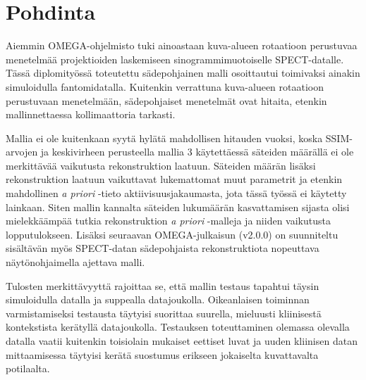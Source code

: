 \section{Pohdinta}
Aiemmin OMEGA-ohjelmisto tuki ainoastaan kuva-alueen rotaatioon perustuvaa menetelmää projektioiden laskemiseen sinogrammimuotoiselle SPECT-datalle. Tässä diplomityössä toteutettu sädepohjainen malli osoittautui toimivaksi ainakin simuloidulla fantomidatalla. Kuitenkin verrattuna kuva-alueen rotaatioon perustuvaan menetelmään, sädepohjaiset menetelmät ovat hitaita, etenkin mallinnettaessa kollimaattoria tarkasti.

Mallia ei ole kuitenkaan syytä hylätä mahdollisen hitauden vuoksi, koska SSIM-arvojen ja keskivirheen perusteella mallia 3 käytettäessä säteiden määrällä ei ole merkittävää vaikutusta rekonstruktion laatuun. Säteiden määrän lisäksi rekonstruktion laatuun vaikuttavat lukemattomat muut parametrit ja etenkin mahdollinen \textit{a priori} -tieto aktiivisuusjakaumasta, jota tässä työssä ei käytetty lainkaan. Siten mallin kannalta säteiden lukumäärän kasvattamisen sijasta olisi mielekkäämpää tutkia rekonstruktion \textit{a priori} -malleja ja niiden vaikutusta lopputulokseen. Lisäksi seuraavan OMEGA-julkaisun (v2.0.0) on suunniteltu sisältävän myös SPECT-datan sädepohjaista rekonstruktiota nopeuttava näytönohjaimella ajettava malli.

Tulosten merkittävyyttä rajoittaa se, että mallin testaus tapahtui täysin simuloidulla datalla ja suppealla datajoukolla. Oikeanlaisen toiminnan varmistamiseksi testausta täytyisi suorittaa suurella, mieluusti kliinisestä kontekstista kerätyllä datajoukolla. Testauksen toteuttaminen olemassa olevalla datalla vaatii kuitenkin toisiolain mukaiset eettiset luvat ja uuden kliinisen datan mittaamisessa täytyisi kerätä suostumus erikseen jokaiselta kuvattavalta potilaalta.